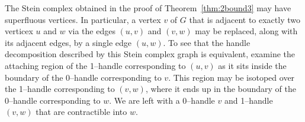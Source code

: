 The Stein complex obtained in the proof of Theorem~\ref{thm:2bound3} may have superfluous vertices.
In particular, a vertex $v$ of $G$ that is adjacent to exactly two verticex $u$ and $w$ via the edges $(u,v)$ and $(v,w)$ may be replaced, along with its adjacent edges, by a single edge $(u,w)$.
To see that the handle decomposition described by this Stein complex graph is equivalent, examine the attaching region of the 1--handle corresponding to $(u,v)$ as it sits inside the boundary of the 0--handle corresponding to $v$.
This region may be isotoped over the 1--handle corresponding to $(v,w)$, where it ends up in the boundary of the 0--handle corresponding to $w$.
We are left with a 0--handle $v$ and 1--handle $(v,w)$ that are contractible into $w$.